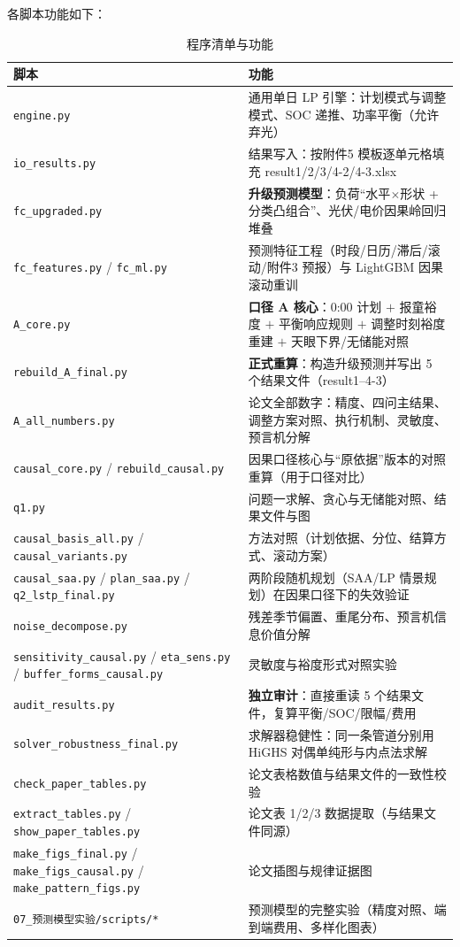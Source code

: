 \documentclass[withoutpreface,bwprint]{cumcmthesis}
\begin{document}
各脚本功能如下：

\begin{table}[htbp]
\centering
\caption{程序清单与功能}
\label{tab:code}
\begin{tabularx}{\textwidth}{@{}p{4.6cm}X@{}}
\toprule
脚本 & 功能 \\
\midrule
\texttt{engine.py} & 通用单日 LP 引擎：计划模式与调整模式、SOC 递推、功率平衡（允许弃光） \\
\texttt{io\_results.py} & 结果写入：按附件5 模板逐单元格填充 result1/2/3/4-2/4-3.xlsx \\
\texttt{fc\_upgraded.py} & \textbf{升级预测模型}：负荷“水平$\times$形状 + 分类凸组合”、光伏/电价因果岭回归堆叠 \\
\texttt{fc\_features.py} / \texttt{fc\_ml.py} & 预测特征工程（时段/日历/滞后/滚动/附件3 预报）与 LightGBM 因果滚动重训 \\
\texttt{A\_core.py} & \textbf{口径 A 核心}：0:00 计划 $+$ 报童裕度 $+$ 平衡响应规则 $+$ 调整时刻裕度重建 $+$ 天眼下界/无储能对照 \\
\texttt{rebuild\_A\_final.py} & \textbf{正式重算}：构造升级预测并写出 5 个结果文件（result1--4-3） \\
\texttt{A\_all\_numbers.py} & 论文全部数字：精度、四问主结果、调整方案对照、执行机制、灵敏度、预言机分解 \\
\texttt{causal\_core.py} / \texttt{rebuild\_causal.py} & 因果口径核心与“原依据”版本的对照重算（用于口径对比） \\
\texttt{q1.py} & 问题一求解、贪心与无储能对照、结果文件与图 \\
\texttt{causal\_basis\_all.py} / \texttt{causal\_variants.py} & 方法对照（计划依据、分位、结算方式、滚动方案） \\
\texttt{causal\_saa.py} / \texttt{plan\_saa.py} / \texttt{q2\_lstp\_final.py} & 两阶段随机规划（SAA/LP 情景规划）在因果口径下的失效验证 \\
\texttt{noise\_decompose.py} & 残差季节偏置、重尾分布、预言机信息价值分解 \\
\texttt{sensitivity\_causal.py} / \texttt{eta\_sens.py} / \texttt{buffer\_forms\_causal.py} & 灵敏度与裕度形式对照实验 \\
\texttt{audit\_results.py} & \textbf{独立审计}：直接重读 5 个结果文件，复算平衡/SOC/限幅/费用 \\
\texttt{solver\_robustness\_\allowbreak final.py} & 求解器稳健性：同一条管道分别用 HiGHS 对偶单纯形与内点法求解 \\
\texttt{check\_paper\_tables.py} & 论文表格数值与结果文件的一致性校验 \\
\texttt{extract\_tables.py} / \texttt{show\_paper\_tables.py} & 论文表 1/2/3 数据提取（与结果文件同源） \\
\texttt{make\_figs\_final.py} / \texttt{make\_figs\_causal.py} / \texttt{make\_pattern\_figs.py} & 论文插图与规律证据图 \\
\texttt{07\_预测模型实验/scripts/*} & 预测模型的完整实验（精度对照、端到端费用、多样化图表） \\
\bottomrule
\end{tabularx}
\end{table}
\end{document}
